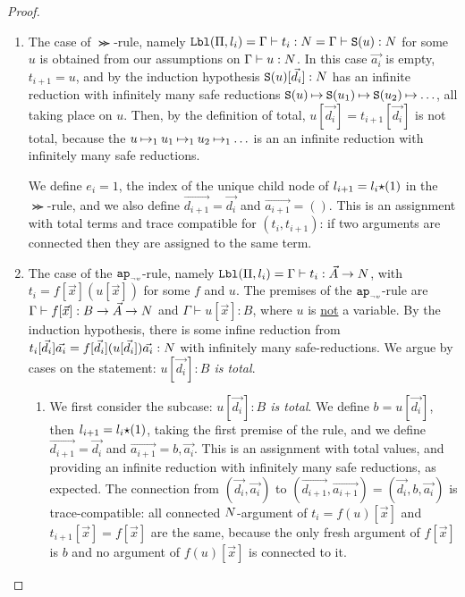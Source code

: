 \begin{proof}
\begin{enumerate}

\item 
  The case of $\Succ$-rule, 
namely ${\tt Lbl}(\Pi,l_i) = \Gamma\vdash t_i: {N} = \Gamma\vdash {\tt S}(u): {N}$
  for some $u$ is obtained from our assumptions on
  $\Gamma\vdash u: {N}$. In this case $\vec{a_i}$ is empty, $t_{i+1}=u$, and
  by the induction hypothesis ${\tt S}(u)[\vec{d_i}]:{N}$ has an infinite reduction with
  infinitely many safe reductions
  ${\tt S}(u) \mathbin{\mapsto}  {\tt S}(u_1) \mathbin{\mapsto} {\tt S}(u_2) \mathbin{\mapsto} \ldots$,
  all taking place on $u$.
  Then, by the definition of total, $u[\vec{d_i}] =t_{i+1}[\vec{d_i}] $ is not total, because the
 $u \mathbin{\mapsto}_1  u_1 \mathbin{\mapsto}_1 u_2 \mathbin{\mapsto}_1 \ldots$ is an  an infinite reduction with
  infinitely many safe reductions.

  We define $e_{i}=1$, 
  the index of the unique child node of $l_{i+1}=l_i{\star}(1)$ in the $\Succ$-rule, and
  we also define $\vec{d_{i+1}} = \vec{d_i}$ and $\vec{a_{i+1}} = ()$. 
  This is an assignment with total terms and 
  trace compatible for $(t_i,t_{i+1})$: if two arguments are connected then they are assigned
  to the same term. 



\item
  The case of the ${{\tt ap}_{\mbox{\tiny $\neg v$}}}$-rule, namely 
  ${\tt Lbl}(\Pi,l_i) = \Gamma\vdash t_i: \vec{A}\rightarrow{N}$, 
  with $t_i = f[\vec{x}](u[\vec{x}])$ for some $f$ and $u$.
  The premises of the ${{\tt ap}_{\mbox{\tiny $\neg v$}}}$-rule
   are $\Gamma\vdash f[\vec{x}]: B \rightarrow \vec{A}\rightarrow{N}$ 
  and $\Gamma\vdash u[\vec{x}]: B$, where $u$ is \underline{not} a variable.
  By the induction hypothesis, there is some infine reduction from
  $t_i[\vec{d_i}]\vec{a_i} = f[\vec{d_i}](u[\vec{d_i}])\vec{a_i}:{N}$ with infinitely many safe-reductions.
  We argue by cases on the statement: \emph{$u[\vec{d_i}]:B$ is total}.





\begin{enumerate}
\item
  We first consider the subcase: \emph{$u[\vec{d_i}]:B$ is total}.
  We define $b = u[\vec{d_i}]$, then $l_{i+1}=l_i{\star}(1)$, taking the first premise of the rule,
  and we define $\vec{d_{i+1}} = \vec{d_i}$ and $\vec{a_{i+1}} = b,\vec{a_i}$. 
  This is an assignment with total values, and providing an infinite reduction with infinitely many safe
  reductions, as expected. 
  The connection from 
  $(\vec{d_i},\vec{a_i})$ to $(\vec{d_{i+1}},\vec{a_{i+1}}) = (\vec{d_i},b,\vec{a_i})$ is
  trace-compatible: all connected 
  ${N}$-argument of $t_{i}=f(u)[\vec{x}]$ and $t_{i+1}[\vec{x}] = f[\vec{x}]$ are the same,
  because the only fresh argument of $f[\vec{x}]$ 
  is $b$ and no argument of $f(u)[\vec{x}]$ is connected to it.



\end{enumerate}
\end{enumerate}
\end{proof}
